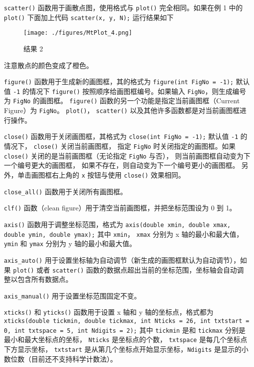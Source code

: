 \verb|scatter()| 函数用于画散点图，使用格式与 \verb|plot()| 完全相同。如果在例 1 中的 \verb|plot()| 下面加上代码
\verb|scatter(x, y, N);|
运行结果如下

\begin{figure}[ht]
\centering
\texttt{[image: ./figures/MtPlot\_4.png]}
\caption{结果 2} \label{MtPlot_fig4}
\end{figure}

注意散点的颜色变成了橙色。

\verb|figure()| 函数用于生成新的画图框，其的格式为
\verb|figure(int FigNo = -1);|
默认值 \verb|-1| 的情况下 \verb|figure()| 按照顺序给画图框编号。如果输入 \verb|FigNo|，则生成编号为 \verb|FigNo| 的画图框。 \verb|figure()| 函数的另一个功能是指定当前画图框（Current Figure）为 \verb|FigNo|。 \verb|plot()|， \verb|scatter()| 以及其他许多函数都是对当前画图框进行操作。

\verb|close()| 函数用于关闭画图框，其格式为
\verb|close(int FigNo = -1);|
默认值 \verb|-1| 的情况下， \verb|close()| 关闭当前画图框， 指定 \verb|FigNo| 时关闭指定的画图框。如果 \verb|close()| 关闭的是当前画图框（无论指定 \verb|FigNo| 与否）， 则当前画图框自动变为下一个编号更大的画图框， 如果不存在，则自动变为下一个编号更小的画图框。 另外，单击画图框右上角的 \verb|x| 按钮与使用 \verb|close()| 效果相同。

\verb|close_all()| 函数用于关闭所有画图框。

\verb|clf()| 函数（clean figure）用于清空当前画图框，并把坐标范围设为 0 到 1。

\verb|axis()| 函数用于调整坐标范围，格式为
\verb|axis(double xmin, double xmax, double ymin, double ymax);|
其中 \verb|xmin|， \verb|xmax| 分别为 x 轴的最小和最大值， \verb|ymin| 和 \verb|ymax| 分别为 y 轴的最小和最大值。

\verb|axis_auto()| 用于设置坐标轴为自动调节（新生成的画图框默认为自动调节），如果 \verb|plot()| 或者 \verb|scatter()| 函数的数据点超出当前的坐标范围，坐标轴会自动调整以包含所有数据点。

\verb|axis_manual()| 用于设置坐标范围固定不变。

\verb|xticks()| 和 \verb|yticks()| 函数用于设置 x 轴和 y 轴的坐标点，格式都为
\verb|xticks(double tickmin, double tickmax, int Nticks = 26, int txtstart = 0, int txtspace = 5, int Ndigits = 2);|
其中 \verb|tickmin| 是和 \verb|tickmax| 分别是最小和最大坐标点的坐标， \verb|Nticks| 是坐标点的个数， \verb|txtspace| 是每几个坐标点下方显示坐标， \verb|txtstart| 是从第几个坐标点开始显示坐标，\verb|Ndigits| 是显示的小数位数（目前还不支持科学计数法）。

